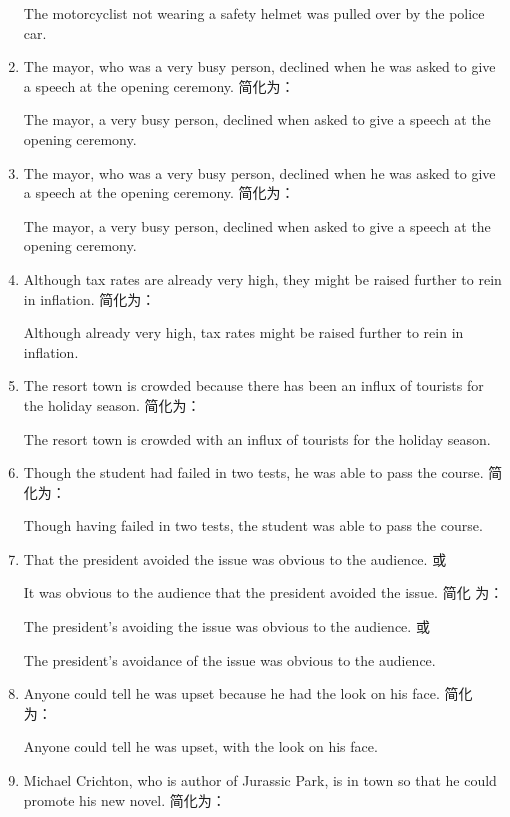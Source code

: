 \begin{enumerate}
  The motorcyclist not wearing a safety helmet was pulled over by the police
  car.
\item The mayor, who was a very busy person, declined when he was asked to give
  a speech at the opening ceremony. 简化为：

  The mayor, a very busy person, declined when asked to give a speech at the
  opening ceremony.

\item The mayor, who was a very busy person, declined when he was asked to give
  a speech at the opening ceremony. 简化为：

  The mayor, a very busy person, declined when asked to give a speech at the
  opening ceremony.

\item Although tax rates are already very high, they might be raised further to
  rein in inflation. 简化为：

  Although already very high, tax rates might be raised further to rein in
  inflation.

\item The resort town is crowded because there has been an influx of tourists
  for the holiday season. 简化为：

  The resort town is crowded with an influx of tourists for the holiday
  season.

\item Though the student had failed in two tests, he was able to pass the
  course. 简化为：

  Though having failed in two tests, the student was able to pass the
  course.

\item That the president avoided the issue was obvious to the audience. 或

  It was obvious to the audience that the president avoided the issue. 简化
  为：

  The president's avoiding the issue was obvious to the audience. 或

  The president's avoidance of the issue was obvious to the audience.
\item Anyone could tell he was upset because he had the look on his face. 简化
  为：

  Anyone could tell he was upset, with the look on his face.

\item Michael Crichton, who is author of Jurassic Park, is in town so that he
  could promote his new novel. 简化为：


\end{enumerate}
